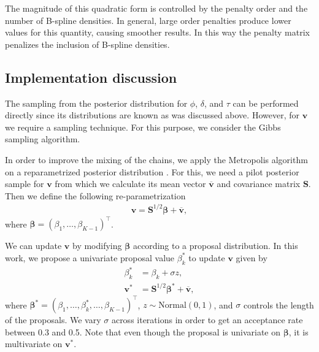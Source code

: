 \documentclass[aps,reprint,amsmath,amssymb,showpacs,showkeys]{revtex4-1}%
\begin{document}
The magnitude of this quadratic form is controlled by the penalty order and the number of B-spline densities.  In general, large order penalties produce lower values for this quantity, causing smoother results.  In this way the penalty matrix penalizes the inclusion of B-spline densities.

\subsection*{Implementation discussion}

The sampling from the posterior distribution for $\phi$, $\delta$, and $\tau$ can be performed directly since its distributions are known as was discussed above.  However, for $\bm{v}$ we require a sampling technique.  For this purpose, we consider the Gibbs sampling algorithm. 

In order to improve the mixing of the chains, we apply the Metropolis algorithm on a reparametrized posterior distribution \citep{Lambert:2007}.  For this, we need a pilot posterior sample for $\bm{v}$ from which we calculate its mean vector $\bm{\overline{v}}$ and covariance matrix $\textbf{S}$.  Then we define the following re-parametrization
\begin{align*}
\bm{v} = \textbf{S}^{1/2} \bm{\beta} + \overline{\bm{v}},
\end{align*}
where $\bm{\beta}=(\beta_1, \dots, \beta_{K-1})^\top$.

We can update $\bm{v}$ by modifying $\bm{\beta}$ according to a proposal distribution.  In this work, we propose a univariate proposal value $\beta_{k}^{*}$ to update $\bm{v}$ given by
\begin{align*}
\beta_{k}^{*} &= \beta_{k} + \sigma z,\\
\bm{v}^{*} &= \textbf{S}^{1/2}\bm{\beta}^{*} + \overline{\bm{v}}, 
\end{align*}
where $\bm{\beta}^{*}= (\beta_1, \dots, \beta_{k}^{*} ,\dots, \beta_{K-1})^\top$, $z \sim \text{Normal}(0,1)$, and $\sigma$ controls the length of the proposals.  We vary $\sigma$ across iterations in order to get an acceptance rate between 0.3 and 0.5.  Note that even though the proposal is univariate on $\bm{\beta}$, it is multivariate on $\bm{v}^*$.
\end{document}
